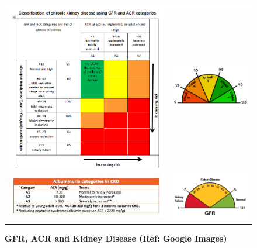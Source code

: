 \begin{figure}
\begin{tabular}{cc}
\includegraphics[scale=0.5]{images/gfr-acr-combined-effect.png} & \includegraphics[scale=1.2]{images/gfr1.png} \\
\includegraphics[scale=0.5]{images/acr-stages} & \includegraphics[scale=1.2]{images/gfr2.png} \\
\end{tabular}
\caption{\textbf{GFR, ACR and Kidney Disease (Ref: Google Images)}}
\label{gfr-acr-ckd}
\vspace{0.25cm}
\end{figure}

